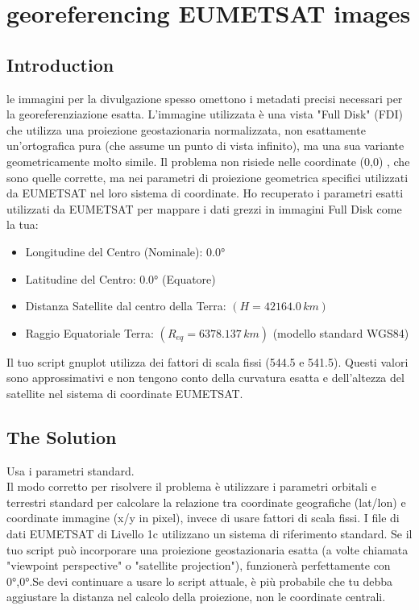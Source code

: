 \documentclass[a4paper,14pt]{article}
\begin{document}
\section{georeferencing EUMETSAT images}
\subsection{Introduction}
le immagini per la divulgazione spesso omettono i metadati precisi necessari per la georeferenziazione esatta. L'immagine utilizzata è una vista "Full Disk" (FDI) che utilizza una proiezione geostazionaria normalizzata, non esattamente un'ortografica pura (che assume un punto di vista infinito), ma una sua variante geometricamente molto simile. Il problema non risiede nelle coordinate (0,0) , che sono quelle corrette, ma nei parametri di proiezione geometrica specifici utilizzati da EUMETSAT nel loro sistema di coordinate.
Ho recuperato i parametri esatti utilizzati da EUMETSAT per mappare i dati grezzi in immagini Full Disk come la tua:
\begin{itemize}
\item Longitudine del Centro (Nominale): 0.0°
\item Latitudine del Centro: 0.0° (Equatore)
\item Distanza Satellite dal centro della Terra: \( (H=42164.0\,km)\)
\item Raggio Equatoriale Terra: \( (R_{eq}=6378.137\,km)\) (modello standard WGS84)
\end{itemize}
Il tuo script gnuplot utilizza dei fattori di scala fissi (544.5 e 541.5). Questi valori sono approssimativi e non tengono conto della curvatura esatta e dell'altezza del satellite nel sistema di coordinate EUMETSAT.
\subsection{The Solution}
Usa i parametri standard.\\
Il modo corretto per risolvere il problema è utilizzare i parametri orbitali e terrestri standard per calcolare la relazione tra coordinate geografiche (lat/lon) e coordinate immagine (x/y in pixel), invece di usare fattori di scala fissi. I file di dati EUMETSAT di Livello 1c utilizzano un sistema di riferimento standard. Se il tuo script può incorporare una proiezione geostazionaria esatta (a volte chiamata "viewpoint perspective" o "satellite projection"), funzionerà perfettamente con 0°,0°.Se devi continuare a usare lo script attuale, è più probabile che tu debba aggiustare la distanza nel calcolo della proiezione, non le coordinate centrali.
\end{document}

